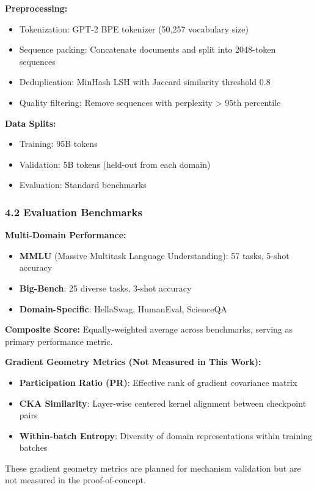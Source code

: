 \textbf{Preprocessing:}
\begin{itemize}
\item Tokenization: GPT-2 BPE tokenizer (50,257 vocabulary size)
\item Sequence packing: Concatenate documents and split into 2048-token sequences
\item Deduplication: MinHash LSH with Jaccard similarity threshold 0.8
\item Quality filtering: Remove sequences with perplexity > 95th percentile
\end{itemize}

\textbf{Data Splits:}
\begin{itemize}
\item Training: 95B tokens
\item Validation: 5B tokens (held-out from each domain)
\item Evaluation: Standard benchmarks
\end{itemize}

\subsubsection{4.2 Evaluation Benchmarks}

\textbf{Multi-Domain Performance:}
\begin{itemize}
\item \textbf{MMLU} (Massive Multitask Language Understanding): 57 tasks, 5-shot accuracy
\item \textbf{Big-Bench}: 25 diverse tasks, 3-shot accuracy
\item \textbf{Domain-Specific}: HellaSwag, HumanEval, ScienceQA
\end{itemize}

\textbf{Composite Score:} Equally-weighted average across benchmarks, serving as primary performance metric.

\textbf{Gradient Geometry Metrics (Not Measured in This Work):}
\begin{itemize}
\item \textbf{Participation Ratio (PR)}: Effective rank of gradient covariance matrix
\item \textbf{CKA Similarity}: Layer-wise centered kernel alignment between checkpoint pairs
\item \textbf{Within-batch Entropy}: Diversity of domain representations within training batches
\end{itemize}

These gradient geometry metrics are planned for mechanism validation but are not measured in the proof-of-concept.

